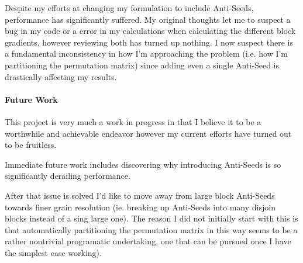 \documentclass[12pt]{article}
\begin{document}
Despite my efforts at changing my formulation to include Anti-Seeds, performance has significantly suffered. My original thoughts let me to suspect a bug in my code or a error in my calculations when calculating the different block gradients, however reviewing both has turned up nothing. I now suspect there is a fundamental inconsistency in how I'm approaching the problem (i.e. how I'm partitioning the permutation matrix) since adding even a single Anti-Seed is drastically affecting my results.

\paragraph{Future Work}

This project is very much a work in progress in that I believe it to be a worthwhile and achievable endeavor however my current efforts have turned out to be fruitless.

Immediate future work includes discovering why introducing Anti-Seeds is so significantly derailing performance. 

After that issue is solved I'd like to move away from large block Anti-Seeds towards finer grain resolution (ie. breaking up Anti-Seeds into many disjoin blocks instead of a sing large one).  The reason I did not initially start with this is that automatically partitioning the permutation matrix in this way seems to be a rather nontrivial programatic undertaking, one that can be pursued once I have the simplest case working). 
\nocite{*}



\end{document}
